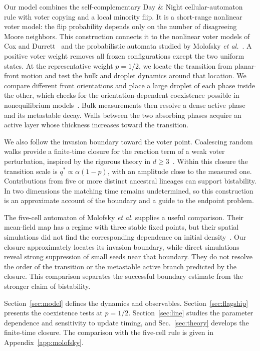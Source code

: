 Our model combines the self-complementary Day \& Night cellular-automaton rule with voter
copying and a local minority flip. It is a short-range nonlinear voter model: the flip
probability depends only on the number of disagreeing Moore neighbors. This construction
connects it to the nonlinear voter models of Cox and Durrett~\cite{cox1991} and the
probabilistic automata studied by Molofsky \emph{et al.}~\cite{molofsky1999}. A positive voter
weight removes all frozen configurations except the two uniform states. At the
representative weight $p=1/2$, we locate the transition from planar-front motion and test
the bulk and droplet dynamics around that location. We compare different front
orientations and place a large droplet of each phase inside the other, which checks for
the orientation-dependent coexistence possible in nonequilibrium
models~\cite{wang2015,liu2018}. Bulk measurements then resolve a dense active phase and its
metastable decay. Walls between the two absorbing phases acquire an active layer whose
thickness increases toward the transition.

We also follow the invasion boundary toward the voter point. Coalescing random walks
provide a finite-time closure for the reaction term of a weak voter perturbation, inspired
by the rigorous theory in $d\ge3$~\cite{cox2013}. Within this closure the transition scale is
$q^*\propto\alpha(1-p)$, with an amplitude close to the measured one. Contributions from
five or more distinct ancestral lineages can support bistability. In two dimensions the
matching time remains undetermined, so this construction is an approximate account of the
boundary and a guide to the endpoint problem.

The five-cell automaton of Molofsky \emph{et al.} supplies a useful comparison. Their
mean-field map has a regime with three stable fixed points, but their spatial simulations
did not find the corresponding dependence on initial density~\cite{molofsky1999}.
Our closure approximately locates its invasion boundary, while direct simulations reveal
strong suppression of small seeds near that boundary. They do not resolve the order of
the transition or the metastable active branch predicted by the closure. This comparison
separates the successful boundary estimate from the stronger claim of bistability.

Section~\ref{sec:model} defines the dynamics and observables.
Section~\ref{sec:flagship} presents the coexistence tests at $p=1/2$.
Section~\ref{sec:line} studies the parameter dependence and sensitivity to update timing,
and Sec.~\ref{sec:theory} develops the finite-time closure.
The comparison with the five-cell rule is given in Appendix~\ref{app:molofsky}.
